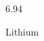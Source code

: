 \documentclass[12pt]{article}
\begin{document}
\hfill{}
\vfill
\begin{center}
  {\fontsize{50}{60}
  }

  6.94

Lithium
\end{center}
\vfill
\end{document}
